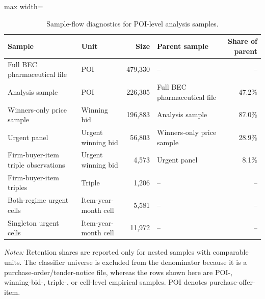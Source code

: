\begin{table}[ht]
\centering
\caption{Sample-flow diagnostics for POI-level analysis samples.}
\label{tab:sample_flow_diagnostics}
\begin{threeparttable}
\small
\setlength{\tabcolsep}{3pt}
\begin{adjustbox}{max width=\textwidth}
\begin{tabular}{@{}p{.23\linewidth}p{.15\linewidth}r p{.20\linewidth}r@{}}
\toprule
Sample & Unit & Size & Parent sample & Share of parent \\
\midrule
Full BEC pharmaceutical file & POI & 479{,}330 & -- & -- \\
Analysis sample & POI & 226{,}305 & Full BEC pharmaceutical file & 47.2\% \\
Winners-only price sample & Winning bid & 196{,}883 & Analysis sample & 87.0\% \\
Urgent panel & Urgent winning bid & 56{,}803 & Winners-only price sample & 28.9\% \\
Firm-buyer-item triple observations & Urgent winning bid & 4{,}573 & Urgent panel & 8.1\% \\
Firm-buyer-item triples & Triple & 1{,}206 & -- & -- \\
Both-regime urgent cells & Item-year-month cell & 5{,}581 & -- & -- \\
Singleton urgent cells & Item-year-month cell & 11{,}972 & -- & -- \\
\bottomrule
\end{tabular}
\end{adjustbox}
\begin{tablenotes}[flushleft]\footnotesize
\item \textit{Notes:} Retention shares are reported only for nested samples with comparable units. The classifier universe is excluded from the denominator because it is a purchase-order/tender-notice file, whereas the rows shown here are POI-, winning-bid-, triple-, or cell-level empirical samples. POI denotes purchase-offer-item.
\end{tablenotes}
\end{threeparttable}
\end{table}

